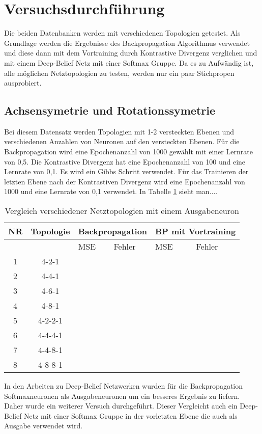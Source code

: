 \documentclass[12pt]{article}
\begin{document}
\section{Versuchsdurchführung}
Die beiden Datenbanken werden mit verschiedenen Topologien getestet. Als Grundlage werden die Ergebnisse des Backpropagation Algorithmus verwendet und diese dann mit dem Vortraining durch Kontrastive Divergenz verglichen und mit einem Deep-Belief Netz mit einer Softmax Gruppe. Da es zu Aufwändig ist, alle möglichen Netztopologien zu testen, werden nur ein paar Stichpropen ausprobiert.

\subsection{Achsensymetrie und Rotationssymetrie}
Bei diesem Datensatz werden Topologien mit 1-2 versteckten Ebenen und verschiedenen Anzahlen von Neuronen auf den versteckten Ebenen. Für die Backpropagation wird eine Epochenanzahl von 1000 gewählt mit einer Lernrate von 0,5. Die Kontrastive Divergenz hat eine Epochenanzahl von 100 und eine Lernrate von 0,1. Es wird ein Gibbs Schritt verwendet. Für das Trainieren der letzten Ebene nach der Kontrastiven Divergenz wird eine Epochenanzahl von 1000 und eine Lernrate von 0,1 verwendet. In Tabelle \ref{sigmoid} sieht man....
\begin{table}[H]


\begin{tabularx}{\textwidth}{|c|c|X|X|X|X|}
	\hline
	NR & Topologie & \multicolumn{2}{|c|}{Backpropagation} & \multicolumn{2}{|c|}{BP mit Vortraining} \\\hline
	&&MSE& Fehler&MSE& Fehler
	\\\hline
	1&4-2-1&&&&\\\hline
	2&4-4-1&&&&\\\hline
	3&4-6-1&&&&\\\hline
	4&4-8-1&&&&\\\hline
	5&4-2-2-1&&&&\\\hline
	6&4-4-4-1&&&&\\\hline
	7&4-4-8-1&&&&\\\hline
	8&4-8-8-1&&&&\\\hline
	\end{tabularx}
	\caption{Vergleich verschiedener Netztopologien mit einem Ausgabeneuron}
	\label{sigmoid}
	\end{table}
	
	
	
	In den Arbeiten zu Deep-Belief Netzwerken wurden für die Backpropagation Softmaxneuronen als Ausgabeneuronen um ein besseres Ergebnis zu liefern. Daher wurde ein weiterer Versuch durchgeführt. Dieser Vergleicht auch ein Deep-Belief Netz mit einer Softmax Gruppe in der vorletzten Ebene die auch als Ausgabe verwendet wird.
\end{document}
